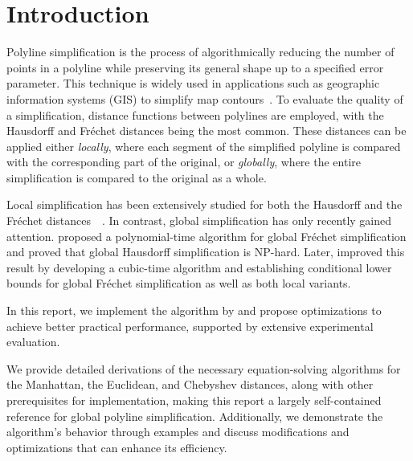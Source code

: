 \section{Introduction}
\label{sec:introduction}
Polyline simplification is the process of algorithmically reducing the number of points in a polyline while preserving its general shape up to a specified error parameter. This technique is widely used in applications such as geographic information systems (GIS) to simplify map contours~\cite{algorithms_reduction_number_points_caricature}. To evaluate the quality of a simplification, distance functions between polylines are employed, with the Hausdorff and Fréchet distances being the most common. These distances can be applied either \emph{locally}, where each segment of the simplified polyline is compared with the corresponding part of the original, or \emph{globally}, where the entire simplification is compared to the original as a whole. 

Local simplification has been extensively studied for both the Hausdorff and the Fréchet distances~\cite{polyline_simplification_under_the_local_frechet_distance_has_almost_quadratic_runtime_in_2d_storandtetal}~\cite{computational_geometric_methods_for_polygonal_approximations_of_a_curve}. In contrast, global simplification has only recently gained attention. \citeauthor{on_optimal_polyline_simplification_using_the_hausdorff_and_frechet_distance} proposed a polynomial-time algorithm for global Fréchet simplification and proved that global Hausdorff simplification is NP-hard. Later, \citeauthor{polyline_simplification_has_cubic_complexity_bringmannetal} improved this result by developing a cubic-time algorithm and establishing conditional lower bounds for global Fréchet simplification as well as both local variants. 

In this report, we implement the algorithm by \citeauthor{on_optimal_polyline_simplification_using_the_hausdorff_and_frechet_distance} and propose optimizations to achieve better practical performance, supported by extensive experimental evaluation. 

We provide detailed derivations of the necessary equation-solving algorithms for the Manhattan, the Euclidean, and Chebyshev distances, along with other prerequisites for implementation, making this report a largely self-contained reference for global polyline simplification. Additionally, we demonstrate the algorithm's behavior through examples and discuss modifications and optimizations that can enhance its efficiency. 

